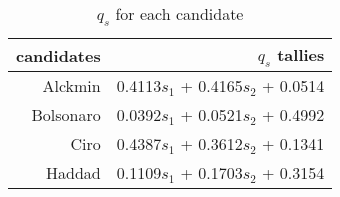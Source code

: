 \begin{table}[H]
  \centering
  \begin{tabular}{rr}
    \hline
    candidates & \(q_{s}\) tallies \\\hline
    Alckmin & 0.4113\(s_{1}\) + 0.4165\(s_2\) + 0.0514 \\
    Bolsonaro & 0.0392\(s_{1}\) + 0.0521\(s_2\) + 0.4992 \\
    Ciro & 0.4387\(s_{1}\) + 0.3612\(s_2\) + 0.1341 \\
    Haddad & 0.1109\(s_{1}\) + 0.1703\(s_2\) + 0.3154 \\\hline\hline
  \end{tabular}
  \caption{\(q_{s}\) for each candidate}
  \label{tbl:ws}
\end{table}
